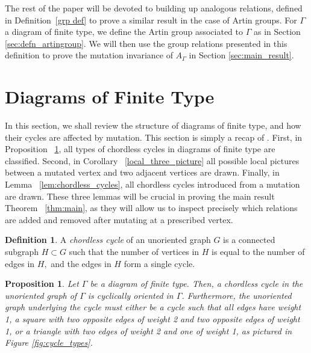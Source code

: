 \documentclass[11pt]{amsart}
\newtheorem{prop}[thm]{Proposition}
\theoremstyle{definition}
\newtheorem{defn}[thm]{Definition}
\begin{document}
The rest of the paper will be devoted to building up analogous relations, defined in Definition~\ref{grp def} to prove a similar result in the case of Artin groups. For $\Gamma$ a diagram of finite type, we define the Artin group associated to $\Gamma$ as in Section \ref{sec:defn_artingroup}. We will then use the group relations presented in this definition to prove the mutation invariance of $A_{\Gamma}$ in Section \ref{sec:main_result}.

\section{Diagrams of Finite Type}
\label{sec:finite-type_diagrams}

In this section, we shall review the structure of diagrams of finite type, and how their cycles are affected by mutation. This section is simply a recap of \cite[Section 2]{BM13}. First, in Proposition ~\ref{cycle_types}, all types of chordless cycles in diagrams of finite type are classified. Second, in Corollary ~\ref{local_three_picture} all possible local pictures between a mutated vertex and two adjacent vertices are drawn. Finally, in Lemma ~\ref{lem:chordless_cycles}, all chordless cycles introduced from a mutation are drawn. These three lemmas will be crucial in proving the main result Theorem ~\ref{thm:main}, as they will allow us to inspect precisely which relations are added and removed after mutating at a prescribed vertex.

\begin{defn}
\label{chordlesscycle}
A {\it chordless cycle} of an unoriented graph $G$ is a connected subgraph $H \subset G$ such that the number of vertices in $H$ is equal to the number of edges in $H,$ and the edges in $H$ form a single cycle.
\end{defn}

\begin{prop}
\label{cycle_types}
\cite[Proposition 2.1]{BM13} Let $\Gamma$ be a diagram of finite type. Then, a chordless cycle in the unoriented graph of $\Gamma$ is cyclically oriented in $\Gamma$. Furthermore, the unoriented graph underlying the cycle must either be a cycle such that all edges have weight 1, a square with two opposite edges of weight 2 and two opposite edges of weight 1, or a triangle with two edges of weight 2 and one of weight 1, as pictured in Figure \ref{fig:cycle_types}.
\end{prop}
\end{document}
